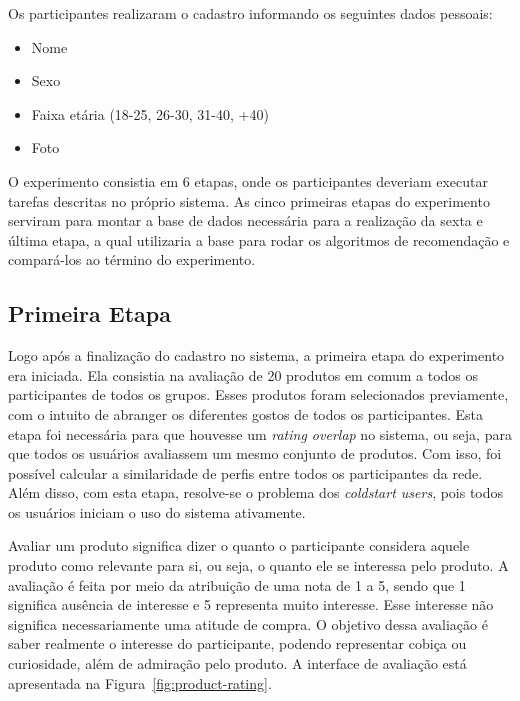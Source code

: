 Os participantes realizaram o cadastro informando os seguintes dados pessoais:

\begin{itemize}
  \item Nome
  \item Sexo
  \item Faixa etária (18-25, 26-30, 31-40, +40)
  \item Foto
\end{itemize}

O experimento consistia em 6 etapas, onde os participantes deveriam executar tarefas descritas no próprio sistema. As cinco primeiras etapas do experimento serviram para montar a base de dados necessária para a realização da sexta e última etapa, a qual utilizaria a base para rodar os algoritmos de recomendação e compará-los ao término do experimento.

\subsection{Primeira Etapa}
\label{cha:primeira_etapa}

Logo após a finalização do cadastro no sistema, a primeira etapa do experimento era iniciada. Ela consistia na avaliação de 20 produtos em comum a todos os participantes de todos os grupos. Esses produtos foram selecionados previamente, com o intuito de abranger os diferentes gostos de todos os participantes. Esta etapa foi necessária para que houvesse um \textit{rating overlap} no sistema, ou seja, para que todos os usuários avaliassem um mesmo conjunto de produtos. Com isso, foi possível calcular a similaridade de perfis entre todos os participantes da rede. Além disso, com esta etapa, resolve-se o problema dos \textit{coldstart users}, pois todos os usuários iniciam o uso do sistema ativamente.

Avaliar um produto significa dizer o quanto o participante considera aquele produto como relevante para si, ou seja, o quanto ele se interessa pelo produto. A avaliação é feita por meio da atribuição de uma nota de 1 a 5, sendo que 1 significa ausência de interesse e 5 representa muito interesse. Esse interesse não significa necessariamente uma atitude de compra. O objetivo dessa avaliação é saber realmente o interesse do participante, podendo representar cobiça ou curiosidade, além de admiração pelo produto. A interface de avaliação está apresentada na Figura~\ref{fig:product-rating}.

